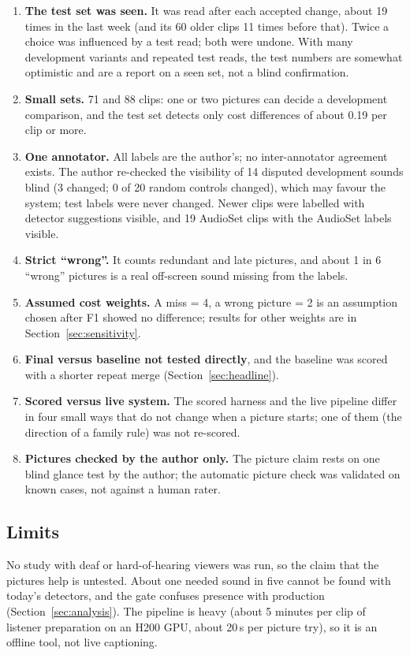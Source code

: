 \begin{enumerate}[label=\textbf{T\arabic*.}, leftmargin=*]
  \item \textbf{The test set was seen.} It was read after each accepted change, about 19 times in the last week (and
        its 60 older clips 11 times before that). Twice a choice was influenced by a test read; both were undone. With
        many development variants and repeated test reads, the test numbers are somewhat optimistic and are a report on a
        seen set, not a blind confirmation.
  \item \textbf{Small sets.} 71 and 88 clips: one or two pictures can decide a development comparison, and the test set
        detects only cost differences of about 0.19 per clip or more.
  \item \textbf{One annotator.} All labels are the author's; no inter-annotator agreement exists. The author re-checked
        the visibility of 14 disputed development sounds blind (3 changed; 0 of 20 random controls changed), which may
        favour the system; test labels were never changed. Newer clips were labelled with detector suggestions visible,
        and 19 AudioSet clips with the AudioSet labels visible.
  \item \textbf{Strict ``wrong''.} It counts redundant and late pictures, and about 1 in 6 ``wrong'' pictures is a real
        off-screen sound missing from the labels.
  \item \textbf{Assumed cost weights.} A miss = 4, a wrong picture = 2 is an assumption chosen after F1 showed no
        difference; results for other weights are in Section~\ref{sec:sensitivity}.
  \item \textbf{Final versus baseline not tested directly}, and the baseline was scored with a shorter repeat merge
        (Section~\ref{sec:headline}).
  \item \textbf{Scored versus live system.} The scored harness and the live pipeline differ in four small ways that do
        not change when a picture starts; one of them (the direction of a family rule) was not re-scored.
  \item \textbf{Pictures checked by the author only.} The picture claim rests on one blind glance test by the author;
        the automatic picture check was validated on known cases, not against a human rater.
\end{enumerate}

\subsection{Limits}
No study with deaf or hard-of-hearing viewers was run, so the claim that the pictures help is untested. About one
needed sound in five cannot be found with today's detectors, and the gate confuses presence with production
(Section~\ref{sec:analysis}). The pipeline is heavy (about 5 minutes per clip of listener preparation on an H200 GPU,
about 20\,s per picture try), so it is an offline tool, not live captioning.

